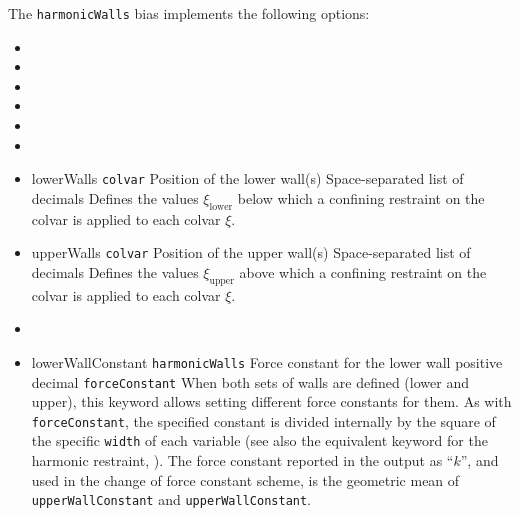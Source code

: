 The \texttt{harmonicWalls} bias implements the following options:
\begin{itemize}
\item {}
\item {}
\item {}
\item {}
\item {}
\item {}

\item %
  \key
    {lowerWalls}{%
    \texttt{colvar}}{%
    Position of the lower wall(s)}{%
    Space-separated list of decimals}{%
    Defines the values $\xi_{\mathrm{lower}}$ below which a confining restraint on the colvar is applied to each colvar $\xi$.}

\item %
  \key
    {upperWalls}{%
    \texttt{colvar}}{%
    Position of the upper wall(s)}{%
    Space-separated list of decimals}{%
    Defines the values $\xi_{\mathrm{upper}}$ above which a confining restraint on the colvar is applied to each colvar $\xi$.}

\item {}

\item %
  \keydef
    {lowerWallConstant}{%
    \texttt{harmonicWalls}}{%
    Force constant for the lower wall}{%
    positive decimal}{%
    \texttt{forceConstant}}{%
    When both sets of walls are defined (lower and upper), this keyword allows setting different force constants for them.
    As with \texttt{forceConstant}, the specified constant is divided internally by the square of the specific \texttt{width} of each variable (see also the equivalent keyword for the harmonic restraint, ).
    The force constant reported in the output as ``$k$'', and used in the change of force constant scheme, is the geometric mean of \texttt{upperWallConstant} and \texttt{upperWallConstant}.
  }


\end{itemize}
